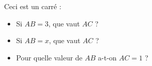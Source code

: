 \begin{MentalActivity}
\begin{mental}
        Ceci est un carré :

        \begin{center}
            
        \end{center}

        \begin{itemize}
            \item Si \( AB=3\), que vaut \( AC\) ?
            \item Si \( AB=x\), que vaut \( AC\) ?
            \item Pour quelle valeur de \( AB\) a-t-on \( AC=1\) ?
        \end{itemize}
\end{mental}
\end{MentalActivity}


